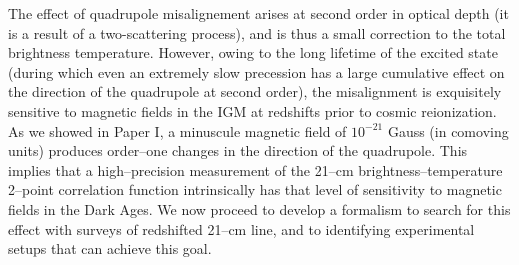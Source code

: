 The effect of quadrupole misalignement arises at second order in optical depth (it is a result of a two-scattering process), and is thus a small correction to the total brightness temperature. However, owing to the long lifetime of the excited state (during which even an extremely slow precession has a large cumulative effect on the direction of the quadrupole at second order), the misalignment is exquisitely sensitive to magnetic fields in the IGM at redshifts prior to cosmic reionization. As we showed in Paper I, a minuscule magnetic field of  $10^{-21}$ Gauss (in comoving units) produces order--one changes in the direction of the quadrupole. This implies that a high--precision measurement of the 21--cm brightness--temperature 2--point correlation function intrinsically has that level of sensitivity to magnetic fields in the Dark Ages. We now proceed to develop a formalism to search for this effect with surveys of redshifted 21--cm line, and to identifying experimental setups that can achieve this goal. 